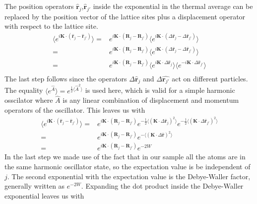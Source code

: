 \documentclass[11pt,letter]{article}
\newcommand{\bv}[1]{\ensuremath{\bm{#1}}}
\begin{document}
The position operators $\hat{\bv{r}}_{j}$,$\hat{\bv{r}}_{j'}$  inside the exponential in the thermal average can be replaced by the position vector of the lattice sites plus a displacement operator with respect to the lattice site.   
\begin{equation}
\begin{split} 
\langle e^{ i \bv{K} \cdot (  \hat{\bv{r}}_{j} - \hat{\bv{r}}_{j'} )  } \rangle = &   
e^{i \bv{K} \cdot ( \bv{R}_{j} - \bv{R}_{j'} ) } 
\langle e^{ i \bv{K} \cdot (  \Delta\hat{\bv{r}}_{j} - \Delta\hat{\bv{r}}_{j'} )  } \rangle \\   
= & e^{i \bv{K} \cdot ( \bv{R}_{j} - \bv{R}_{j'} ) } 
\langle e^{ i \bv{K} \cdot (  \Delta\hat{\bv{r}}_{j} - \Delta\hat{\bv{r}}_{j'} )  } \rangle \\ 
= & e^{i \bv{K} \cdot ( \bv{R}_{j} - \bv{R}_{j'} ) } 
\langle e^{ i \bv{K} \cdot  \Delta\hat{\bv{r}}_{j}} \rangle \langle    e^{ -i \bv{K} \cdot  \Delta\hat{\bv{r}}_{j'}   } \rangle \\ 
\end{split}
\end{equation} 
The last step follows since the operators $\Delta\hat{\bv{r}}_{j}$ and
$\Delta\hat{\bv{r}_{j'}}$  act on different particles.
The equality $\langle e^{\hat{A}} \rangle = e^{\frac{1}{2} \langle \hat{A}^{2} \rangle }$ is used here, 
which is valid for a simple harmonic osscilator where $\hat{A}$ is any linear
combination of displacement and momentum operators of the oscillator.  This leaves us with 
\begin{equation}
\begin{split} 
\langle e^{ i \bv{K} \cdot (  \hat{\bv{r}}_{j} - \hat{\bv{r}}_{j'} )  } \rangle = &   
 e^{i \bv{K} \cdot ( \bv{R}_{j} - \bv{R}_{j'} ) } 
 e^{ -\frac{1}{2} \langle (\bv{K} \cdot  \Delta\hat{\bv{r}}_{j})^{2} \rangle }
 e^{ -\frac{1}{2} \langle (\bv{K} \cdot  \Delta\hat{\bv{r}}_{j'})^{2}  \rangle }  \\
 = &  
 e^{i \bv{K} \cdot ( \bv{R}_{j} - \bv{R}_{j'} ) } 
 e^{ -\langle (\bv{K} \cdot  \Delta\hat{\bv{r}})^{2}  \rangle } \\
 = &  
 e^{i \bv{K} \cdot ( \bv{R}_{j} - \bv{R}_{j'} ) } 
 e^{ -2W} 
\end{split}
\end{equation} 
In the last step we made use of the fact that in our sample all the atoms are
in the same harmonic oscillator state, so the expectation value is be
independent of $j$.   The second exponential with the expectation value is the
Debye-Waller factor, generally written as $e^{-2W}$.  Expanding the dot product inside the Debye-Waller exponential leaves us with
\end{document}
